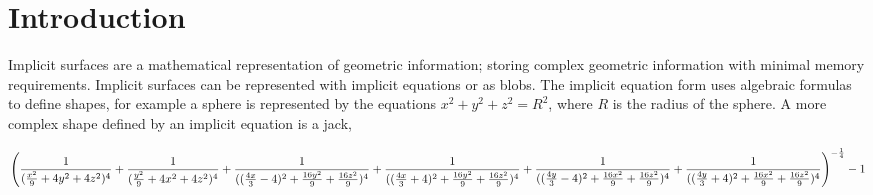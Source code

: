 \documentclass[conference]{acmsiggraph}
\title{\Title}
\author{
	\Author \\
	University of Victoria\\
\Email}
\begin{document}

\maketitle

\begin{abstract}
	Implicit surfaces are a mathematical representation of geometric
	information; storing complex geometric information with minimal memory
	requirements. Blobs are a form of implicit object defined by a central
	origin point, a \fff, and an iso value. The surface is defined at
	radius $r$ when the \fff evaluated on $r$ is equal to the iso value.

	A blob tree is used to build complex geometry from simpler
	primitives. Intelligent construction of the blob-tree is critical for
	fast evaluation of the implicit object represented in the tree, whether
	that be for ray-tracing or polygonization.

\end{abstract}

\keywordlist

\copyrightspace

\section{Introduction}

Implicit surfaces are a mathematical representation of geometric information;
storing complex geometric information with minimal memory requirements.
Implicit surfaces can be represented with implicit equations or as blobs. The
implicit equation form uses algebraic formulas to define shapes, for example a
sphere is represented by the equations $x^2 + y^2 + z^2 = R^2$, where $R$ is
the radius of the sphere. A more complex shape defined by an implicit equation
is a jack,

\begin{dmath*}
\left({1 \over ({x^2 \over 9} +  4y^2 + 4z^2)^4} +
{1 \over ({y^2 \over 9} +  4x^2 + 4z^2)^4} +
{1 \over (({4x \over 3} - 4)^2 + {16y^2 \over 9} +  {16z^2 \over 9})^4} +
{1 \over (({4x \over 3} + 4)^2 + {16y^2 \over 9} +  {16z^2 \over 9})^4} +
{1 \over (({4y \over 3} - 4)^2 + {16x^2 \over 9} +  {16z^2 \over 9})^4} +
{1 \over (({4y \over 3} + 4)^2 + {16x^2 \over 9} +  {16z^2 \over 9})^4}\right)^ {-
	{1\over 4}} - 1
\end{dmath*}
\cite{Bloomenthal1994}
\end{document}
